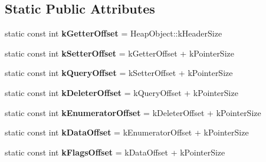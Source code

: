 \subsection*{Static Public Attributes}
\begin{DoxyCompactItemize}
\item 
static const int {\bfseries k\+Getter\+Offset} = Heap\+Object\+::k\+Header\+Size\hypertarget{classv8_1_1internal_1_1_interceptor_info_a5a7a09c21536e5bf9e681cb7471c1f93}{}\label{classv8_1_1internal_1_1_interceptor_info_a5a7a09c21536e5bf9e681cb7471c1f93}

\item 
static const int {\bfseries k\+Setter\+Offset} = k\+Getter\+Offset + k\+Pointer\+Size\hypertarget{classv8_1_1internal_1_1_interceptor_info_afaa43ccd4e8941f93886c882032b58e1}{}\label{classv8_1_1internal_1_1_interceptor_info_afaa43ccd4e8941f93886c882032b58e1}

\item 
static const int {\bfseries k\+Query\+Offset} = k\+Setter\+Offset + k\+Pointer\+Size\hypertarget{classv8_1_1internal_1_1_interceptor_info_ad34aeb460b38822a4344a7124487a210}{}\label{classv8_1_1internal_1_1_interceptor_info_ad34aeb460b38822a4344a7124487a210}

\item 
static const int {\bfseries k\+Deleter\+Offset} = k\+Query\+Offset + k\+Pointer\+Size\hypertarget{classv8_1_1internal_1_1_interceptor_info_a5df7acb53275aec9c83dc91565e9726a}{}\label{classv8_1_1internal_1_1_interceptor_info_a5df7acb53275aec9c83dc91565e9726a}

\item 
static const int {\bfseries k\+Enumerator\+Offset} = k\+Deleter\+Offset + k\+Pointer\+Size\hypertarget{classv8_1_1internal_1_1_interceptor_info_aaf2708a4d9fa94ef7cd075ddcfb093eb}{}\label{classv8_1_1internal_1_1_interceptor_info_aaf2708a4d9fa94ef7cd075ddcfb093eb}

\item 
static const int {\bfseries k\+Data\+Offset} = k\+Enumerator\+Offset + k\+Pointer\+Size\hypertarget{classv8_1_1internal_1_1_interceptor_info_a83a9480c9ca7a458d77ad277a4f82b86}{}\label{classv8_1_1internal_1_1_interceptor_info_a83a9480c9ca7a458d77ad277a4f82b86}

\item 
static const int {\bfseries k\+Flags\+Offset} = k\+Data\+Offset + k\+Pointer\+Size\hypertarget{classv8_1_1internal_1_1_interceptor_info_a489de4011ba2fbf88d71243342bd0e86}{}\label{classv8_1_1internal_1_1_interceptor_info_a489de4011ba2fbf88d71243342bd0e86}


\end{DoxyCompactItemize}
